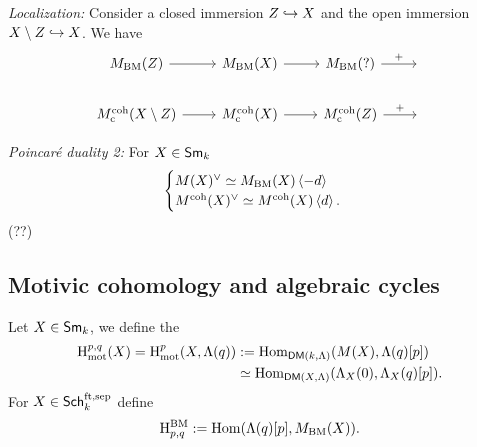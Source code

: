 \emph{Localization:} Consider a closed immersion $Z\hookrightarrow X$ and the open immersion
$X\setminus Z\hookrightarrow X$. We have
\[
\begin{tikzcd}
M_{\text{BM}}(Z) \ar[r] & M_{\text{BM}}(X) \ar[r] & M_{\text{BM}}(?) \ar[r,"+"] & {} \\
M^{\text{coh}}_{\text{c}}(X\setminus Z) \ar[r] & M^{\text{coh}}_{\text{c}}(X) \ar[r] &
M^{\text{coh}}_{\text{c}}(Z) \ar[r,"+"] & {}
\end{tikzcd}
\]

\emph{Poincar\'e duality 2:} For $X\in \mathsf{Sm}_k$
\[
\begin{cases}
M(X)^{\vee} \simeq M_{\text{BM}}(X)\left<-d \right> \\
M^{\text{coh}}(X)^{\vee} \simeq M^{\text{coh}}(X)\left<d \right>.
\end{cases}
\]
(??)

\subsection{Motivic cohomology and algebraic cycles}
\begin{definition}
Let $X\in \mathsf{Sm}_k$, we define the 
\begin{align*}
\mathrm{H}_{\text{mot}}^{p,q}(X) = \mathrm{H}_{\text{mot}}^{p}(X,\Lambda(q)) &:=
\operatorname{Hom}_{\mathsf{DM}(k,\Lambda)}(M(X), \Lambda(q)[p]) \\
&\simeq \operatorname{Hom}_{\mathsf{DM}(X,\Lambda)}(\Lambda_X(0), \Lambda_X(q)[p]).
\end{align*}
For $X\in \mathsf{Sch}_k^{\text{ft,sep}}$ define
\[
\mathrm{H}_{p,q}^{\text{BM}} := \operatorname{Hom}(\Lambda(q)[p], M_{\text{BM}}(X)).
\]
\end{definition}
